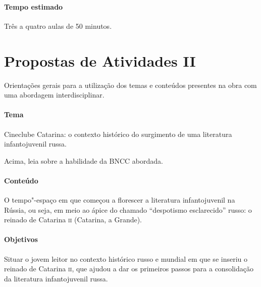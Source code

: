 \documentclass[11pt]{extarticle}
\begin{document}
\paragraph{Tempo estimado} Três a quatro aulas de 50 minutos.

\section{Propostas de Atividades II}

Orientações gerais para a utilização dos temas e conteúdos
presentes na obra com uma abordagem interdisciplinar.

\paragraph{Tema} Cineclube Catarina: o contexto histórico do
surgimento de uma literatura infantojuvenil russa.

Acima, leia sobre a habilidade da BNCC abordada.

\paragraph{Conteúdo}
O tempo"-espaço em que começou a florescer a literatura infantojuvenil na
Rússia, ou seja, em meio ao ápice do chamado ``despotismo esclarecido''
russo: o reinado de Catarina \textsc{ii} (Catarina, a Grande).

\paragraph{Objetivos}
Situar o jovem leitor no contexto histórico russo e mundial em que se
inseriu o reinado de Catarina \textsc{ii}, que ajudou a dar os primeiros passos
para a consolidação da literatura infantojuvenil russa.
\end{document}
